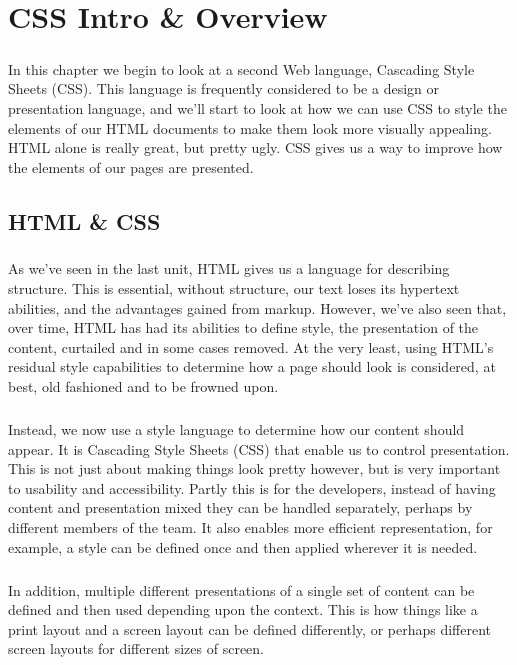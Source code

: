 \chapter{CSS Intro \& Overview}
\label{css}
\paragraph{} In this chapter we begin to look at a second Web language, Cascading Style Sheets (CSS). This language is frequently considered to be a design or presentation language, and we'll start to look at how we can use CSS to style the elements of our HTML documents to make them look more visually appealing. HTML alone is really great, but pretty ugly. CSS gives us a way to improve how the elements of our pages are presented.

\section{HTML  \& CSS}
\paragraph{} As we've seen in the last unit, HTML gives us a language for describing structure. This is essential, without structure, our text loses its hypertext abilities, and the advantages gained from markup. However, we've also seen that, over time, HTML has had its abilities to define style, the presentation of the content, curtailed and in some cases removed. At the very least, using HTML's residual style capabilities to determine how a page should look is considered, at best, old fashioned and to be frowned upon.
\paragraph{} Instead, we now use a style language to determine how our content should appear. It is Cascading Style Sheets (CSS) that enable us to control presentation. This is not just about making things look pretty however, but is very important to usability and accessibility. Partly this is for the developers, instead of having content and presentation mixed they can be handled separately, perhaps by different members of the team. It also enables more efficient representation, for example, a style can be defined once and then applied wherever it is needed. 
\paragraph{} In addition, multiple different presentations of a single set of content can be defined and then used depending upon the context. This is how things like a print layout and a screen layout can be defined differently, or perhaps different screen layouts for different sizes of screen.
